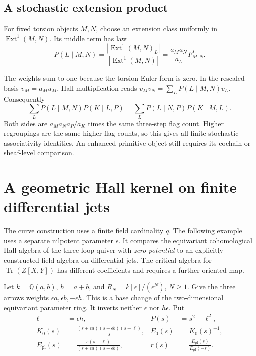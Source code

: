 \subsection{A stochastic extension product}

For fixed torsion objects $M,N$, choose an extension class
uniformly in $\operatorname{Ext}^1(M,N)$. Its middle term has law
\[
 P(L\mid M,N)
 =\frac{|\operatorname{Ext}^1(M,N)_L|}
        {|\operatorname{Ext}^1(M,N)|}
 =\frac{a_Ma_N}{a_L}F^L_{M,N}.
\]

The weights sum to one because the torsion Euler form is zero.
In the rescaled basis $v_M=a_Mu_M$, Hall multiplication reads
$v_Mv_N=\sum_LP(L\mid M,N)v_L$. Consequently
\[
 \sum_LP(L\mid M,N)P(K\mid L,P)
 =\sum_LP(L\mid N,P)P(K\mid M,L).
\]
Both sides are $a_Ma_Na_P/a_K$ times the same three-step
flag count. Higher regroupings are the same higher flag
counts, so this gives all finite stochastic associativity
identities. An enhanced primitive object still requires
its cochain or sheaf-level comparison.



\section{A geometric Hall kernel on finite differential jets}
\label{v4-arith:curve:sec:jets}

The curve construction uses a finite field cardinality $q$.
The following example uses a separate nilpotent parameter
$\epsilon$. It compares the equivariant cohomological Hall
algebra of the three-loop quiver with \emph{zero potential}
to an explicitly constructed field algebra on differential jets.
The critical algebra for $\operatorname{Tr}(Z[X,Y])$ has
different coefficients and requires a further oriented map.

Let $k=\mathbb Q(a,b)$, $h=a+b$, and
$R_N=k[\epsilon]/(\epsilon^N)$, $N\geq1$.
Give the three arrows weights $\epsilon a,\epsilon b,-\epsilon h$.
This is a base change of the two-dimensional equivariant
parameter ring. It inverts neither $\epsilon$ nor $h\epsilon$.
Put
\begin{equation}\label{v4-arith:curve:eq:euler-kernels}
 \begin{aligned}
 \ell&=\epsilon h,& P(s)&=s^2-\ell^2,\\
 K_0(s)&=\frac{(s+\epsilon a)(s+\epsilon b)(s-\ell)}s,
 &E_0(s)&=K_0(s)^{-1},\\
 E_{\mathrm{pl}}(s)&=\frac{s(s+\ell)}{(s+\epsilon a)(s+\epsilon b)},
 &r(s)&=\frac{E_{\mathrm{pl}}(s)}{E_{\mathrm{pl}}(-s)}.
 \end{aligned}
\end{equation}


